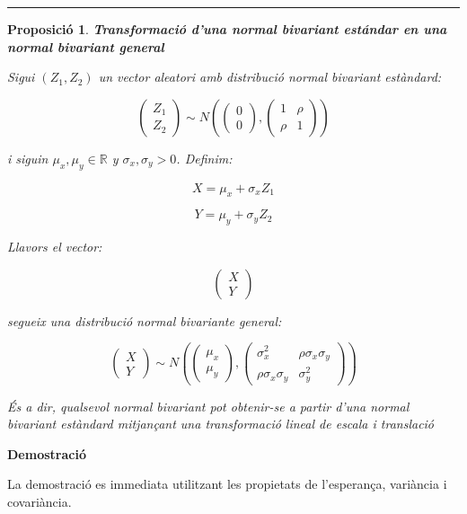 \documentclass[
  catalan,
]{article}
\newtheorem{proposition}{Proposició}[section]
\theoremstyle{definition}
\theoremstyle{definition}
\theoremstyle{definition}
\theoremstyle{definition}
\theoremstyle{remark}
\begin{document}
\begin{center}\rule{0.5\linewidth}{0.5pt}\end{center}

\begin{proposition}
\textbf{Transformació d'una normal bivariant estándar en una normal bivariant general}

Sigui \((Z_1,Z_2)\) un vector aleatori amb distribució normal bivariant estàndard:

\[
\begin{pmatrix}
Z_1\\
Z_2
\end{pmatrix}
\sim
N
\left(
\begin{pmatrix}
0\\
0
\end{pmatrix},
\begin{pmatrix}
1 & \rho\\
\rho & 1
\end{pmatrix}
\right)
\]

i siguin \(\mu_x,\mu_y\in\mathbb{R}\) y \(\sigma_x,\sigma_y>0\). Definim:

\[
X=\mu_x+\sigma_x Z_1
\]

\[
Y=\mu_y+\sigma_y Z_2
\]

Llavors el vector:

\[
\begin{pmatrix}
X\\
Y
\end{pmatrix}
\]

segueix una distribució normal bivariante general:

\[
\begin{pmatrix}
X\\
Y
\end{pmatrix}
\sim
N
\left(
\begin{pmatrix}
\mu_x\\
\mu_y
\end{pmatrix},
\begin{pmatrix}
\sigma_x^2 & \rho\sigma_x\sigma_y\\
\rho\sigma_x\sigma_y & \sigma_y^2
\end{pmatrix}
\right)
\]

És a dir, qualsevol normal bivariant pot obtenir-se a partir d'una normal bivariant estàndard mitjançant una transformació lineal de escala i translació
\end{proposition}

\textbf{Demostració}

La demostració es immediata utilitzant les propietats de l'esperança, variància i covariància.
\end{document}
